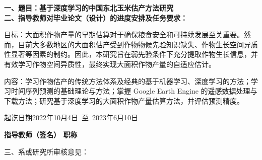 \cleardoublepage{}

{
    \bfseries
    \noindent 一、题目：基于深度学习的中国东北玉米估产方法研究 \\
    \noindent 二、指导教师对毕业论文（设计）的进度安排及任务要求：\\

    \par 目标：大面积作物产量的早期估算对于确保粮食安全和可持续发展至关重要。然而，目前大多数地区的大面积估产受到作物物候先验知识缺失、作物生长空间异质性显著等因素的制约。因此，本研究旨在弱先验条件下充分提取作物生长信息，并有效学习作物空间异质性，最终实现大面积作物产量的自适应估计。
    
    \par 内容：学习作物估产的传统方法体系及经典的基于机器学习、深度学习的方法；学习时间序列预测的基础理论与方法；掌握 Google Earth Engine 的遥感数据处理与下载方法；研究基于深度学习的大面积作物产量估算方法，并评估预测精度。

    \vskip 20mm

    \noindent 起讫日期\quad 2022年10月4日~至~2023年6月10日
    \begin{flushright}
        \bfseries {}
            指导教师（签名） \underline{} 职称 \underline{}
    \end{flushright}

    \noindent 三、系或研究所审核意见：\\

    \mbox{} \vfill
    \signature{负责人（签名）}
}
